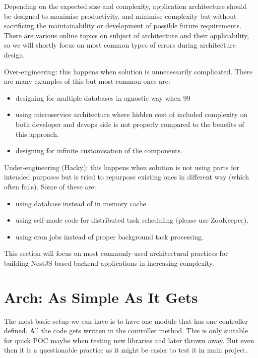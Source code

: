 Depending on the expected size and complexity, application architecture should be designed to maximise productivity,
and minimise complexity but without sacrificing the maintainability or development of possible future requirements.
There are various online topics on subject of architecture and their applicability, so we will shortly focus on most
common types of errors during architecture design.

Over-engineering: this happens when solution is unnecessarily complicated.
There are many examples of this but most common ones are:
\begin{itemize}
  \item designing for multiple databases in agnostic way when 99%
  \item using microservice architecture where hidden cost of included complexity on both developer and devops side is not
  properly compared to the benefits of this approach.
  \item designing for infinite customisation of the components.
\end{itemize}

Under-engineering (Hacky): this happens when solution is not using parts for intended purposes but is tried to repurpose
existing ones in different way (which often fails).
Some of these are:
\begin{itemize}
  \item using database instead of in memory cache.
  \item using self-made code for distributed task scheduling (please use ZooKeeper).
  \item using cron jobs instead of proper background task processing.
\end{itemize}


This section will focus on most commonly used architectural practices for building NestJS based backend applications
in increasing complexity.

\section{Arch: As Simple As It Gets}\label{sec:arch-as-simple-as-it-gets}

The most basic setup we can have is to have one module that has one controller defined.
All the code gets written in the controller method.
This is only suitable for quick POC maybe when testing new libraries and later thrown away.
But even then it is a questionable practice as it might be easier to test it in main project.

